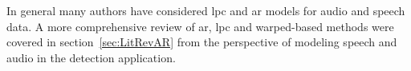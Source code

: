 In general many authors have considered \gls{lpc} and \gls{ar} models for audio and speech data\cite{Vaseghi1990}\cite{Czyzewski1995}\cite{Godsill1998}. A more comprehensive review of \gls{ar}, \gls{lpc} and warped-based methods were covered in section~\ref{sec:LitRevAR} from the perspective of modeling speech and audio in the detection application.

%







